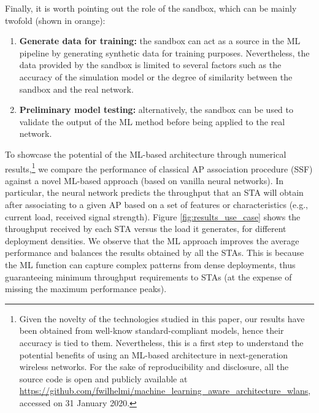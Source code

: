 \documentclass[journal]{IEEEtran}
\begin{document}
Finally, it is worth pointing out the role of the sandbox, which can be mainly twofold (shown in orange):
\begin{enumerate}
	\item \textbf{Generate data for training:} the sandbox can act as a source in the ML pipeline by generating synthetic data for training purposes. Nevertheless, the data provided by the sandbox is limited to several factors such as the accuracy of the simulation model or the degree of similarity between the sandbox and the real network. %
	\item \textbf{Preliminary model testing:} alternatively, the sandbox can be used to validate the output of the ML method before being applied to the real network.
\end{enumerate}

To showcase the potential of the ML-based architecture through numerical results,\footnote{Given the novelty of the technologies studied in this paper, our results have been obtained from well-know standard-compliant models, hence their accuracy is tied to them. Nevertheless, this is a first step to understand the potential benefits of using an ML-based architecture in next-generation wireless networks. For the sake of reproducibility and disclosure, all the source code is open and publicly available at \href{https://github.com/fwilhelmi/machine_learning_aware_architecture_wlans}{https://github.com/fwilhelmi/machine\_learning\_aware\_architecture\_wlans}, accessed on 31 January 2020.} we compare the performance of classical AP association procedure (SSF) against a novel ML-based approach (based on vanilla neural networks). In particular, the neural network predicts the throughput that an STA will obtain after associating to a given AP based on a set of features or characteristics (e.g., current load, received signal strength). Figure \ref{fig:results_use_case} shows the throughput received by each STA versus the load it generates, for different deployment densities. We observe that the ML approach improves the average performance and balances the results obtained by all the STAs. This is because the ML function can capture complex patterns from dense deployments, thus guaranteeing minimum throughput requirements to STAs (at the expense of missing the maximum performance peaks).
\end{document}
